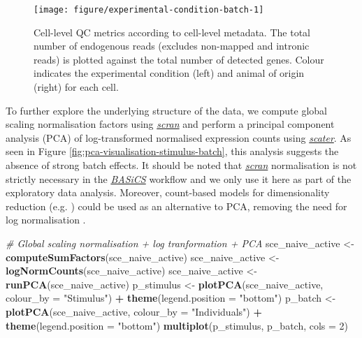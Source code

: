 \documentclass[9pt,a4paper,]{extarticle}
\newenvironment{Shaded}{\begin{snugshade}}{\end{snugshade}}
\newcommand{\CommentTok}[1]{\textcolor[rgb]{0.56,0.35,0.01}{\textit{#1}}}
\newcommand{\DataTypeTok}[1]{\textcolor[rgb]{0.13,0.29,0.53}{#1}}
\newcommand{\DecValTok}[1]{\textcolor[rgb]{0.00,0.00,0.81}{#1}}
\newcommand{\KeywordTok}[1]{\textcolor[rgb]{0.13,0.29,0.53}{\textbf{#1}}}
\newcommand{\NormalTok}[1]{#1}
\newcommand{\OperatorTok}[1]{\textcolor[rgb]{0.81,0.36,0.00}{\textbf{#1}}}
\newcommand{\StringTok}[1]{\textcolor[rgb]{0.31,0.60,0.02}{#1}}
\begin{document}
\begin{figure}

{\centering \texttt{[image: figure/experimental-condition-batch-1]} 

}

\caption{Cell-level QC metrics according to cell-level metadata. The total number of endogenous reads (excludes non-mapped and intronic reads) is plotted against the total number of detected genes. Colour indicates the experimental condition (left) and animal of origin (right) for each cell.}\label{fig:experimental-condition-batch}
\end{figure}

To further explore the underlying structure of the data, we compute global
scaling normalisation factors using \emph{\href{https://bioconductor.org/packages/3.11/scran}{scran}} and perform a
principal component analysis (PCA) of log-transformed normalised expression
counts using \emph{\href{https://bioconductor.org/packages/3.11/scater}{scater}}.
As seen in Figure \ref{fig:pca-visualisation-stimulus-batch}, this analysis
suggests the absence of strong batch effects.
It should be noted that \emph{\href{https://bioconductor.org/packages/3.11/scran}{scran}} normalisation
is not strictly necessary in the \emph{\href{https://bioconductor.org/packages/3.11/BASiCS}{BASiCS}} workflow and we only
use it here as part of the exploratory data analysis.
Moreover, count-based models for dimensionality reduction (e.g. \citep{Townes2019, Lopez2018}) could be used as an alternative to PCA,
removing the need for log normalisation .

\begin{Shaded}
\begin{Highlighting}[]
\CommentTok{# Global scaling normalisation + log tranformation + PCA}
\NormalTok{sce_naive_active <-}\StringTok{ }\KeywordTok{computeSumFactors}\NormalTok{(sce_naive_active)}
\NormalTok{sce_naive_active <-}\StringTok{ }\KeywordTok{logNormCounts}\NormalTok{(sce_naive_active)}
\NormalTok{sce_naive_active <-}\StringTok{ }\KeywordTok{runPCA}\NormalTok{(sce_naive_active)}
\NormalTok{p_stimulus <-}\StringTok{ }\KeywordTok{plotPCA}\NormalTok{(sce_naive_active, }\DataTypeTok{colour_by =} \StringTok{"Stimulus"}\NormalTok{) }\OperatorTok{+}
\StringTok{  }\KeywordTok{theme}\NormalTok{(}\DataTypeTok{legend.position =} \StringTok{"bottom"}\NormalTok{)}
\NormalTok{p_batch <-}\StringTok{ }\KeywordTok{plotPCA}\NormalTok{(sce_naive_active, }\DataTypeTok{colour_by =} \StringTok{"Individuals"}\NormalTok{) }\OperatorTok{+}
\StringTok{  }\KeywordTok{theme}\NormalTok{(}\DataTypeTok{legend.position =} \StringTok{"bottom"}\NormalTok{)}
\KeywordTok{multiplot}\NormalTok{(p_stimulus, p_batch, }\DataTypeTok{cols =} \DecValTok{2}\NormalTok{)}
\end{Highlighting}
\end{Shaded}
\end{document}
